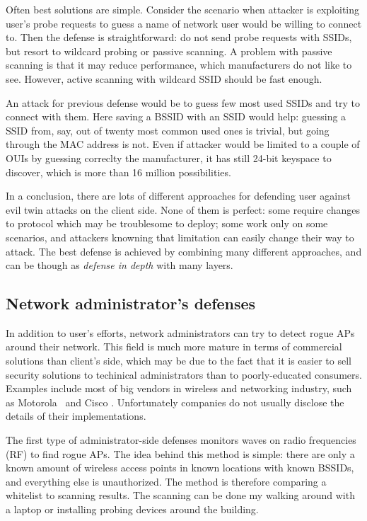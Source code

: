 \documentclass[12pt,a4paper,oneside,pdftex]{report}
\begin{document}
Often best solutions are simple. Consider the scenario when attacker is exploiting user's probe requests to guess a name of network user would be willing to connect to. Then the defense is straightforward: do not send probe requests with SSIDs, but resort to wildcard probing or passive scanning. A problem with passive scanning is that it may reduce performance, which manufacturers do not like to see. However, active scanning with wildcard SSID should be fast enough.

An attack for previous defense would be to guess few most used SSIDs and try to connect with them. Here saving a BSSID with an SSID would help: guessing a SSID from, say, out of twenty most common used ones is trivial, but going through the MAC address is not. Even if attacker would be limited to a couple of OUIs by guessing correclty the manufacturer, it has still 24-bit keyspace to discover, which is more than 16 million possibilities.

In a conclusion, there are lots of different approaches for defending user against evil twin attacks on the client side. None of them is perfect: some require changes to protocol which may be troublesome to deploy; some work only on some scenarios, and attackers knowning that limitation can easily change their way to attack. The best defense is achieved by combining many different approaches, and can be though as \emph{defense in depth} with many layers.

\subsection{Network administrator's defenses}

In addition to user's efforts, network administrators can try to detect rogue APs around their network. This field is much more mature in terms of commercial solutions than client's side, which may be due to the fact that it is easier to sell security solutions to techinical administrators than to poorly-educated consumers. Examples include most of big vendors in wireless and networking industry, such as Motorola~\cite{motorola_airdefense} and Cisco \cite{cisco_ips}. Unfortunately companies do not usually disclose the details of their implementations.

The first type of administrator-side defenses monitors waves on radio frequencies (RF) to find rogue APs. The idea behind this method is simple: there are only a known amount of wireless access points in known locations with known BSSIDs, and everything else is unauthorized. The method is therefore comparing a whitelist to scanning results. The scanning can be done my walking around with a laptop or installing probing devices around the building.~\cite{proxim_rogue_ap}
\end{document}
